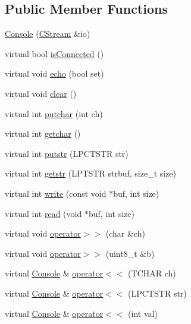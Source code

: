 \subsection*{Public Member Functions}
\begin{DoxyCompactItemize}
\item 
\hyperlink{class_console_a8374ffffac8edeaa0775bdd1923bdc10}{Console} (\hyperlink{class_c_stream}{C\-Stream} \&io)
\item 
virtual bool \hyperlink{class_console_a855191be30cd0e1eeaea2d6ab7cda03b}{is\-Connected} ()
\item 
virtual void \hyperlink{class_console_a78bb22aa6e31673a5675986c9c5e3529}{echo} (bool set)
\item 
virtual void \hyperlink{class_console_a61f9d57ebeecfd8553f02a84b4939e69}{clear} ()
\item 
virtual int \hyperlink{class_console_a1427b8f1d904381c49188a1f8d8da083}{putchar} (int ch)
\item 
virtual int \hyperlink{class_console_a404cc62475ef74f818d9102bdde09584}{getchar} ()
\item 
virtual int \hyperlink{class_console_a0a229393c4d71b47cb68d30397d5de1e}{putstr} (L\-P\-C\-T\-S\-T\-R str)
\item 
virtual int \hyperlink{class_console_ab28b81a0b1e462ec0df65ba0a573921f}{getstr} (L\-P\-T\-S\-T\-R strbuf, size\-\_\-t size)
\item 
virtual int \hyperlink{class_console_a3ff57fe349e1335039230e14b9fc0cb1}{write} (const void $\ast$buf, int size)
\item 
virtual int \hyperlink{class_console_a10df5763117e36da9f029d1dfa9641be}{read} (void $\ast$buf, int size)
\item 
virtual void \hyperlink{class_console_ae80d540e36c5522b8653359e1e4d6839}{operator$>$$>$} (char \&ch)
\item 
virtual void \hyperlink{class_console_a33c9beff5456efdd13209b8321df1a74}{operator$>$$>$} (uint8\-\_\-t \&b)
\item 
virtual \hyperlink{class_console}{Console} \& \hyperlink{class_console_afc5355f4c4fee0a91c4ba5ae6647f07d}{operator$<$$<$} (T\-C\-H\-A\-R ch)
\item 
virtual \hyperlink{class_console}{Console} \& \hyperlink{class_console_aa05d7169f95dc3a36b11a291e35c84ae}{operator$<$$<$} (L\-P\-C\-T\-S\-T\-R str)
\item 
virtual \hyperlink{class_console}{Console} \& \hyperlink{class_console_a01e2cf3bdbb5ff14689a8858e12da5ad}{operator$<$$<$} (int val)
\item 

\end{DoxyCompactItemize}
